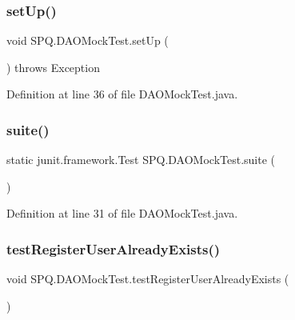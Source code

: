 \subsubsection{\texorpdfstring{set\+Up()}{setUp()}}
{\footnotesize\ttfamily void S\+P\+Q.\+D\+A\+O\+Mock\+Test.\+set\+Up (\begin{DoxyParamCaption}{ }\end{DoxyParamCaption}) throws Exception}



Definition at line 36 of file D\+A\+O\+Mock\+Test.\+java.

\mbox{\label{class_s_p_q_1_1_d_a_o_mock_test_a940e298a31bfdb331a7fdd7a5655e270}} 
\subsubsection{\texorpdfstring{suite()}{suite()}}
{\footnotesize\ttfamily static junit.\+framework.\+Test S\+P\+Q.\+D\+A\+O\+Mock\+Test.\+suite (\begin{DoxyParamCaption}{ }\end{DoxyParamCaption})\hspace{0.3cm}{\ttfamily [static]}}



Definition at line 31 of file D\+A\+O\+Mock\+Test.\+java.

\mbox{\label{class_s_p_q_1_1_d_a_o_mock_test_a76004a006ddce595edc7011aafccbe7e}} 
\subsubsection{\texorpdfstring{test\+Register\+User\+Already\+Exists()}{testRegisterUserAlreadyExists()}}
{\footnotesize\ttfamily void S\+P\+Q.\+D\+A\+O\+Mock\+Test.\+test\+Register\+User\+Already\+Exists (\begin{DoxyParamCaption}{ }\end{DoxyParamCaption})}



